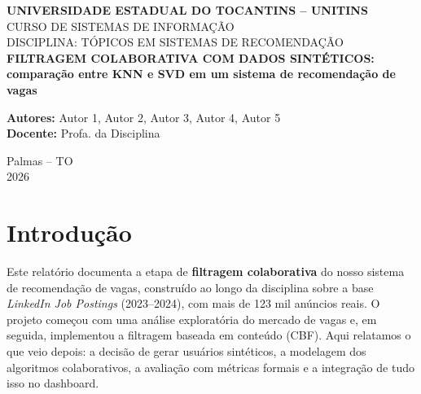 \documentclass[12pt,a4paper]{article}
\begin{document}
\begin{titlepage}
    \centering
    \vspace*{1cm}
    {\large \textbf{UNIVERSIDADE ESTADUAL DO TOCANTINS -- UNITINS}}\\[0.5cm]
    {\large CURSO DE SISTEMAS DE INFORMAÇÃO}\\[0.5cm]
    {\large DISCIPLINA: TÓPICOS EM SISTEMAS DE RECOMENDAÇÃO}\\[3.5cm]

    {\Large \textbf{FILTRAGEM COLABORATIVA COM DADOS SINTÉTICOS:}}\\[0.3cm]
    {\large \textbf{comparação entre KNN e SVD em um sistema de recomendação de vagas}}\\[3.5cm]

    \begin{flushright}
        \textbf{Autores:} Autor 1, Autor 2, Autor 3, Autor 4, Autor 5\\
        \textbf{Docente:} Profa. da Disciplina
    \end{flushright}

    \vfill
    {\large Palmas -- TO}\\
    {\large 2026}
\end{titlepage}

\tableofcontents
\thispagestyle{empty}
\newpage
\setcounter{page}{1}

\section{Introdução}

Este relatório documenta a etapa de \textbf{filtragem colaborativa} do nosso sistema de recomendação de vagas, construído ao longo da disciplina sobre a base \textit{LinkedIn Job Postings} (2023--2024), com mais de 123 mil anúncios reais. O projeto começou com uma análise exploratória do mercado de vagas e, em seguida, implementou a filtragem baseada em conteúdo (CBF). Aqui relatamos o que veio depois: a decisão de gerar usuários sintéticos, a modelagem dos algoritmos colaborativos, a avaliação com métricas formais e a integração de tudo isso no dashboard.
\end{document}
